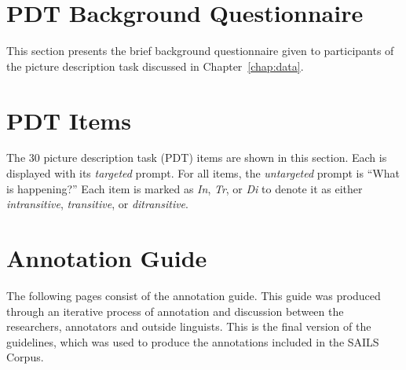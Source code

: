 \begin{appendices}


\chapter{PDT Background Questionnaire}
\label{appendix:questionnaire}
This section presents the brief background questionnaire given to participants of the picture description task discussed in Chapter~\ref{chap:data}.



\chapter{PDT Items}
\label{appendix:PDT_items}
The 30 picture description task (PDT) items are shown in this section. Each is displayed with its \textit{targeted} prompt. For all items, the \textit{untargeted} prompt is ``What is happening?'' Each item is marked as \textit{In}, \textit{Tr}, or \textit{Di} to denote it as either \textit{intransitive}, \textit{transitive}, or \textit{ditransitive}.



\chapter{Annotation Guide}
\label{appendix:annotation_guide}
The following pages consist of the annotation guide. This guide was produced through an iterative process of annotation and discussion between the researchers, annotators and outside linguists. This is the final version of the guidelines, which was used to produce the annotations included in the SAILS Corpus.



\end{appendices}